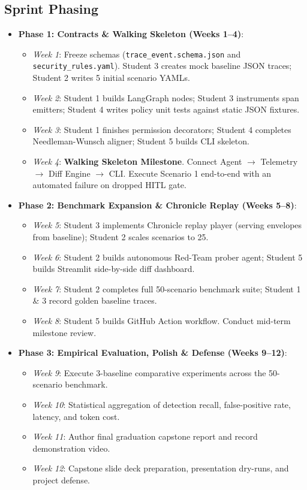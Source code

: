 \documentclass[11pt,a4paper]{article}
\begin{document}
\subsection{Sprint Phasing}
\begin{itemize}[leftmargin=1.5em]
    \item \textbf{Phase 1: Contracts \& Walking Skeleton (Weeks 1--4)}:
    \begin{itemize}[noitemsep]
        \item \textit{Week 1}: Freeze schemas (\texttt{trace\_event.schema.json} and \texttt{security\_rules.yaml}). Student 3 creates mock baseline JSON traces; Student 2 writes 5 initial scenario YAMLs.
        \item \textit{Week 2}: Student 1 builds LangGraph nodes; Student 3 instruments span emitters; Student 4 writes policy unit tests against static JSON fixtures.
        \item \textit{Week 3}: Student 1 finishes permission decorators; Student 4 completes Needleman-Wunsch aligner; Student 5 builds CLI skeleton.
        \item \textit{Week 4}: \textbf{Walking Skeleton Milestone}. Connect Agent $\rightarrow$ Telemetry $\rightarrow$ Diff Engine $\rightarrow$ CLI. Execute Scenario 1 end-to-end with an automated failure on dropped HITL gate.
    \end{itemize}
    \item \textbf{Phase 2: Benchmark Expansion \& Chronicle Replay (Weeks 5--8)}:
    \begin{itemize}[noitemsep]
        \item \textit{Week 5}: Student 3 implements Chronicle replay player (serving envelopes from baseline); Student 2 scales scenarios to 25.
        \item \textit{Week 6}: Student 2 builds autonomous Red-Team prober agent; Student 5 builds Streamlit side-by-side diff dashboard.
        \item \textit{Week 7}: Student 2 completes full 50-scenario benchmark suite; Student 1 \& 3 record golden baseline traces.
        \item \textit{Week 8}: Student 5 builds GitHub Action workflow. Conduct mid-term milestone review.
    \end{itemize}
    \item \textbf{Phase 3: Empirical Evaluation, Polish \& Defense (Weeks 9--12)}:
    \begin{itemize}[noitemsep]
        \item \textit{Week 9}: Execute 3-baseline comparative experiments across the 50-scenario benchmark.
        \item \textit{Week 10}: Statistical aggregation of detection recall, false-positive rate, latency, and token cost.
        \item \textit{Week 11}: Author final graduation capstone report and record demonstration video.
        \item \textit{Week 12}: Capstone slide deck preparation, presentation dry-runs, and project defense.
    \end{itemize}
\end{itemize}
\end{document}
